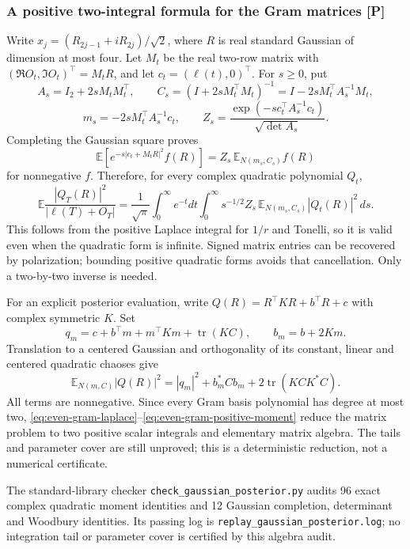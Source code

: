 \subsubsection{A positive two-integral formula for the Gram matrices [P]}
Write $x_j=(R_{2j-1}+iR_{2j})/\sqrt2$, where $R$ is real standard
Gaussian of dimension at most four. Let $M_t$ be the real two-row matrix
with $(\Re O_t,\Im O_t)^\top=M_tR$, and let
$c_t=(\ell(t),0)^\top$. For $s\ge0$, put
\[
A_s=I_2+2sM_tM_t^\top,\qquad
C_s=(I+2sM_t^\top M_t)^{-1}
=I-2sM_t^\top A_s^{-1}M_t,
\]
\[
m_s=-2sM_t^\top A_s^{-1}c_t,\qquad
Z_s=\frac{\exp(-s c_t^\top A_s^{-1}c_t)}{\sqrt{\det A_s}}.
\]
Completing the Gaussian square proves
\[
\mathbb E[e^{-s|c_t+M_tR|^2}f(R)]
=Z_s\,\mathbb E_{N(m_s,C_s)}f(R)
\]
for nonnegative $f$. Therefore, for every complex quadratic polynomial
$Q_t$,
\begin{equation}
\mathbb E\frac{|Q_T(R)|^2}{|\ell(T)+O_T|}
=\frac1{\sqrt\pi}\int_0^\infty e^{-t}dt
\int_0^\infty s^{-1/2}Z_s\,
\mathbb E_{N(m_s,C_s)}|Q_t(R)|^2\,ds.
\label{eq:even-gram-laplace}
\end{equation}
This follows from the positive Laplace integral for $1/r$ and Tonelli,
so it is valid even when the quadratic form is infinite. Signed matrix
entries can be recovered by polarization; bounding positive quadratic
forms avoids that cancellation. Only a two-by-two inverse is needed.

For an explicit posterior evaluation, write
$Q(R)=R^\top K R+b^\top R+c$ with complex symmetric $K$. Set
\[
q_m=c+b^\top m+m^\top Km+\operatorname{tr}(KC),\qquad b_m=b+2Km.
\]
Translation to a centered Gaussian and orthogonality of its constant,
linear and centered quadratic chaoses give
\begin{equation}
\mathbb E_{N(m,C)}|Q(R)|^2
=|q_m|^2+b_m^*Cb_m+2\operatorname{tr}(KC K^*C).
\label{eq:even-gram-positive-moment}
\end{equation}
All terms are nonnegative. Since every Gram basis polynomial has degree
at most two, \eqref{eq:even-gram-laplace}--\eqref{eq:even-gram-positive-moment}
reduce the matrix problem to two positive scalar integrals and elementary
matrix algebra. The tails and parameter cover are still unproved; this
is a deterministic reduction, not a numerical certificate.

The standard-library checker \texttt{check\_gaussian\_posterior.py} audits 96 exact complex quadratic moment identities and 12 Gaussian completion, determinant and Woodbury identities. Its passing log is \texttt{replay\_gaussian\_posterior.log}; no integration tail or parameter cover is certified by this algebra audit.

